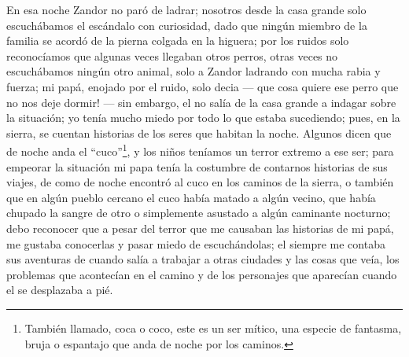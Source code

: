 En esa noche Zandor no paró de ladrar; nosotros desde la casa grande solo escuchábamos el escándalo con curiosidad, dado que ningún miembro de la familia se acordó de la pierna colgada en la higuera; por los ruidos solo reconocíamos que algunas veces llegaban otros perros, otras veces no escuchábamos ningún otro animal, solo a Zandor ladrando con mucha rabia y fuerza; mi papá, enojado por el ruido, solo decia --- que cosa quiere ese perro que no nos deje dormir! --- sin embargo, el no salía de la casa grande a indagar sobre la situación; yo tenía mucho miedo por todo lo que estaba sucediendo; pues, en la sierra, se cuentan historias de los seres que habitan la noche.
Algunos dicen que de noche anda el ``cuco''\footnote{También llamado, coca o coco, este es un ser mítico, una especie de fantasma, bruja o espantajo que anda de noche por los caminos.}, y los niños teníamos un terror extremo a ese ser; para empeorar la situación mi papa tenía la costumbre de contarnos historias de sus viajes, de como de noche encontró al cuco en los caminos de la sierra, o también que en algún pueblo cercano el cuco había matado a algún vecino, que había chupado la sangre de otro o simplemente asustado a algún caminante nocturno; debo reconocer que a pesar del terror que me causaban las historias de mi papá, me gustaba conocerlas y pasar miedo de escuchándolas; el siempre me contaba sus aventuras de cuando salía a trabajar a otras ciudades y las cosas que veía, los problemas que acontecían en el camino y de los personajes que aparecían cuando el se desplazaba a pié.

